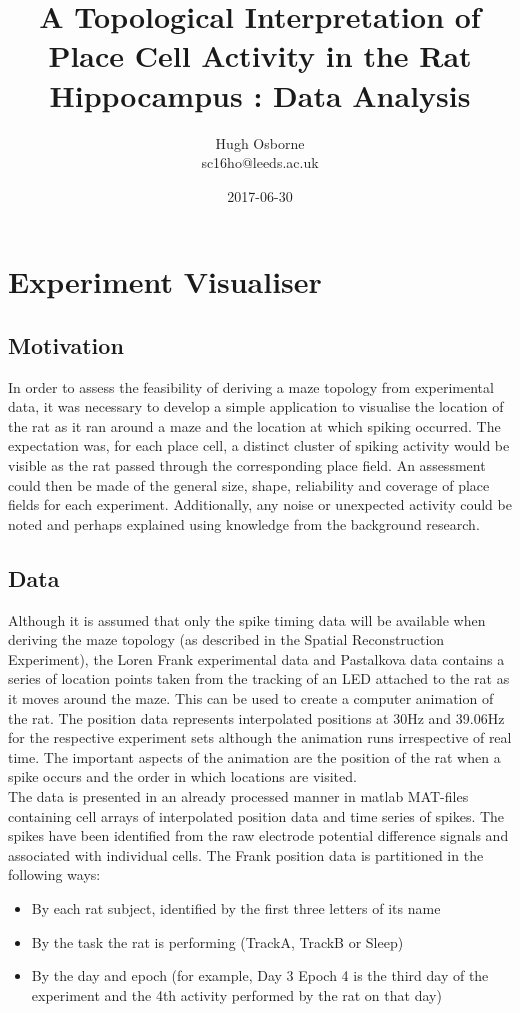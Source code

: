 \documentclass[11pt]{report}
\title{A Topological Interpretation of Place Cell Activity in the Rat Hippocampus : Data Analysis }
\date{2017-06-30}
\author{Hugh Osborne \\ sc16ho@leeds.ac.uk}
\begin{document}
\newpage
	\maketitle
\tableofcontents
\newpage
\chapter{Experiment Visualiser}
\section{Motivation}
In order to assess the feasibility of deriving a maze topology from experimental data, it was necessary to develop a simple application to visualise the location of the rat as it ran around a maze and the location at which spiking occurred. The expectation was, for each place cell, a distinct cluster of spiking activity would be visible as the rat passed through the corresponding place field. An assessment could then be made of the general size, shape, reliability and coverage of place fields for each experiment. Additionally, any noise or unexpected activity could be noted and perhaps explained using knowledge from the background research.

\section{Data}
Although it is assumed that only the spike timing data will be available when deriving the maze topology (as described in the Spatial Reconstruction Experiment), the Loren Frank experimental data and Pastalkova data \cite{pastalkova2008internally} contains a series of location points taken from the tracking of an LED attached to the rat as it moves around the maze. This can be used to create a computer animation of the rat. The position data represents interpolated positions at 30Hz and 39.06Hz for the respective experiment sets although the animation runs irrespective of real time. The important aspects of the animation are the position of the rat when a spike occurs and the order in which locations are visited. \\
The data is presented in an already processed manner in matlab MAT-files containing cell arrays of interpolated position data and time series of spikes. The spikes have been identified from the raw electrode potential difference signals and associated with individual cells. The Frank position data is partitioned in the following ways:\\
\begin{itemize}
\item By each rat subject, identified by the first three letters of its name
\item By the task the rat is performing (TrackA, TrackB or Sleep)
\item By the day and epoch (for example, Day 3 Epoch 4 is the third day of the experiment and the 4th activity performed by the rat on that day)
\end{itemize}
\end{document}
